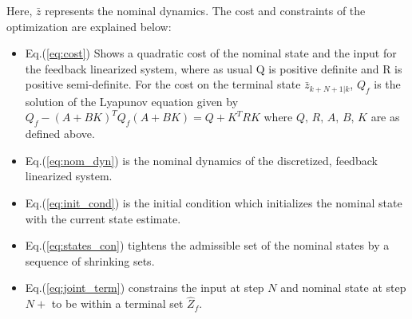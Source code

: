 Here, $\bar{z}$ represents the nominal dynamics. The cost and constraints of the optimization are explained below:
\begin{itemize}
\item Eq.(\ref{eq:cost}) Shows a quadratic cost of the nominal state and the input for the feedback linearized system, where as usual Q is positive definite and R is positive semi-definite. For the cost on the terminal state $\bar{z}_{k+N+1|k}$, $Q_f$ is the solution of the Lyapunov equation given by $Q_f-(A+BK)^{T}Q_f(A+BK) = Q+K^{T}RK$ where $Q,\,R,\,A,\,B,\,K$ are as defined above.

\item Eq.(\ref{eq:nom_dyn}) is the nominal dynamics of the discretized, feedback linearized system.

\item Eq.(\ref{eq:init_cond}) is the initial condition which initializes the nominal state with the current state estimate.

\item Eq.(\ref{eq:states_con}) tightens the admissible set of the nominal states by a sequence of shrinking sets.

\item Eq.(\ref{eq:joint_term}) constrains the input at step $N$ and nominal state at step $N+$  to be within a terminal set $\hat{Z}_f$.

\end{itemize}





